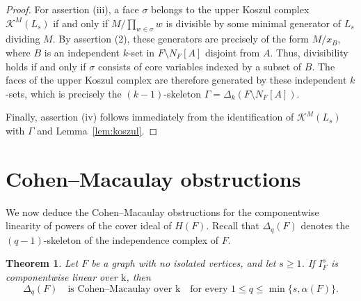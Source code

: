 \documentclass[12pt]{amsart}
\newtheorem{theorem}{Theorem}[section]
\theoremstyle{definition}
\theoremstyle{remark}
\begin{document}
\begin{proof}
For assertion (iii), a face $\sigma$ belongs to the upper Koszul complex $\mathcal{K}^M(L_s)$ if and only if $M / \prod_{w \in \sigma} w$ is divisible by some minimal generator of $L_s$ dividing $M$. By assertion (2), these generators are precisely of the form $M / x_B$, where $B$ is an independent $k$-set in $F \setminus N_F[A]$ disjoint from $A$. Thus, divisibility holds if and only if $\sigma$ consists of core variables indexed by a subset of $B$. The faces of the upper Koszul complex are therefore generated by these independent $k$-sets, which is precisely the $(k-1)$-skeleton $\Gamma = \Delta_{k}(F \setminus N_F[A])$. 

Finally, assertion (iv) follows immediately from the identification of $\mathcal{K}^M(L_s)$ with $\Gamma$ and Lemma~\ref{lem:koszul}.
\end{proof}

\section{Cohen--Macaulay obstructions}\label{sec:CM}
We now deduce the Cohen--Macaulay obstructions for the componentwise linearity of powers of the cover ideal of $H(F)$. Recall that $\Delta_q(F)$ denotes the $(q-1)$-skeleton of the independence complex of $F$.

\begin{theorem}\label{thm:CM}
Let $F$ be a graph with no isolated vertices, and let $s \ge 1$. If $I_F^s$ is componentwise linear over $\mathrm{k}$, then
\[
\Delta_q(F) \quad \text{is Cohen--Macaulay over } \mathrm{k} \quad \text{for every } 1 \le q \le \min\{s, \alpha(F)\}.
\]
\end{theorem}
\end{document}
